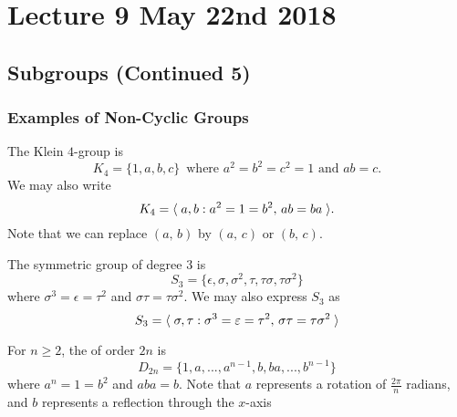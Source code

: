 \chapter{Lecture 9 May 22nd 2018}%
\label{chp:lecture_9_may_22nd_2018}

\section{Subgroups (Continued 5)}%
\label{sec:subgroups_continued_5}

\subsection{Examples of Non-Cyclic Groups}%
\label{sub:examples_of_non_cyclic_groups}

\begin{eg}
  The Klein $4$-group is
  \begin{equation*}
    K_4 = \{1, a, b, c\} \enspace \text{where } a^2 = b^2 = c^2 = 1 \text{ and } ab = c.
  \end{equation*}
  We may also write
  \begin{equation*}
    K_4 = \langle \;  a, b : a^2 = 1 = b^2, \, ab = ba  \; \rangle.
  \end{equation*}
  Note that we can replace $( a, \, b )$ by $( a, \, c )$ or $( b, \, c )$.
\end{eg}

\begin{eg}
  The symmetric group of degree $3$ is
  \begin{equation*}
    S_3 = \{\epsilon, \sigma, \sigma^2, \tau, \tau \sigma, \tau \sigma^2 \}
  \end{equation*}
  where $\sigma^3 = \epsilon = \tau^2$ and $\sigma \tau = \tau \sigma^2$. We may also express $S_3$ as
  \begin{equation*}
    S_3 = \langle \;  \sigma, \tau : \sigma^3 = \varepsilon = \tau^2, \, \sigma \tau = \tau \sigma^2  \; \rangle
  \end{equation*}
\end{eg}

\begin{defn}
\label{defn:dihedral_group}
  For $n \geq 2$, the  of order $2n$ is
  \begin{equation*}
    D_{2n} = \{1, a, ..., a^{n - 1}, b, ba, ..., b^{n - 1} \}
  \end{equation*}
  where $a^n = 1 = b^2$ and $aba = b$. Note that $a$ represents a rotation of $\frac{2 \pi}{n}$ radians, and $b$ represents a reflection through the $x$-axis
\end{defn}

